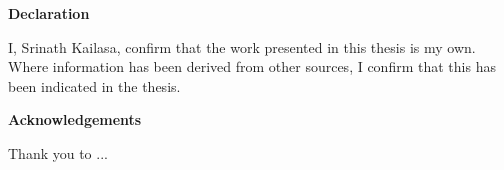 \thispagestyle{plain}

\begin{center}
    \textbf{Declaration}
\end{center}
I, Srinath Kailasa, confirm that the work presented in this thesis is my own. Where information has been derived from other sources, I confirm that this has been indicated in the thesis.


\begin{center}
    \textbf{Acknowledgements}
\end{center}

Thank you to ...